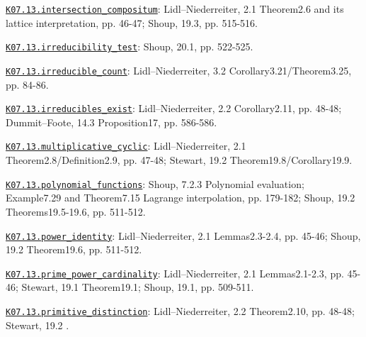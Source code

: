 \par\smallskip\noindent\hypertarget{src:K07.13.intersection_compositum}{}\label{src:K07.13.intersection_compositum}\hyperref[K07.13.intersection_compositum]{\texttt{K07.13.intersection\_compositum}}: Lidl--Niederreiter, 2.1 Theorem2.6 and its lattice interpretation, pp. 46-47; Shoup, 19.3, pp. 515-516.
\par\smallskip\noindent\hypertarget{src:K07.13.irreducibility_test}{}\label{src:K07.13.irreducibility_test}\hyperref[K07.13.irreducibility_test]{\texttt{K07.13.irreducibility\_test}}: Shoup, 20.1, pp. 522-525.
\par\smallskip\noindent\hypertarget{src:K07.13.irreducible_count}{}\label{src:K07.13.irreducible_count}\hyperref[K07.13.irreducible_count]{\texttt{K07.13.irreducible\_count}}: Lidl--Niederreiter, 3.2 Corollary3.21/Theorem3.25, pp. 84-86.
\par\smallskip\noindent\hypertarget{src:K07.13.irreducibles_exist}{}\label{src:K07.13.irreducibles_exist}\hyperref[K07.13.irreducibles_exist]{\texttt{K07.13.irreducibles\_exist}}: Lidl--Niederreiter, 2.2 Corollary2.11, pp. 48-48; Dummit--Foote, 14.3 Proposition17, pp. 586-586.
\par\smallskip\noindent\hypertarget{src:K07.13.multiplicative_cyclic}{}\label{src:K07.13.multiplicative_cyclic}\hyperref[K07.13.multiplicative_cyclic]{\texttt{K07.13.multiplicative\_cyclic}}: Lidl--Niederreiter, 2.1 Theorem2.8/Definition2.9, pp. 47-48; Stewart, 19.2 Theorem19.8/Corollary19.9.
\par\smallskip\noindent\hypertarget{src:K07.13.polynomial_functions}{}\label{src:K07.13.polynomial_functions}\hyperref[K07.13.polynomial_functions]{\texttt{K07.13.polynomial\_functions}}: Shoup, 7.2.3 Polynomial evaluation; Example7.29 and Theorem7.15 Lagrange interpolation, pp. 179-182; Shoup, 19.2 Theorems19.5-19.6, pp. 511-512.
\par\smallskip\noindent\hypertarget{src:K07.13.power_identity}{}\label{src:K07.13.power_identity}\hyperref[K07.13.power_identity]{\texttt{K07.13.power\_identity}}: Lidl--Niederreiter, 2.1 Lemmas2.3-2.4, pp. 45-46; Shoup, 19.2 Theorem19.6, pp. 511-512.
\par\smallskip\noindent\hypertarget{src:K07.13.prime_power_cardinality}{}\label{src:K07.13.prime_power_cardinality}\hyperref[K07.13.prime_power_cardinality]{\texttt{K07.13.prime\_power\_cardinality}}: Lidl--Niederreiter, 2.1 Lemmas2.1-2.3, pp. 45-46; Stewart, 19.1 Theorem19.1; Shoup, 19.1, pp. 509-511.
\par\smallskip\noindent\hypertarget{src:K07.13.primitive_distinction}{}\label{src:K07.13.primitive_distinction}\hyperref[K07.13.primitive_distinction]{\texttt{K07.13.primitive\_distinction}}: Lidl--Niederreiter, 2.2 Theorem2.10, pp. 48-48; Stewart, 19.2 .
